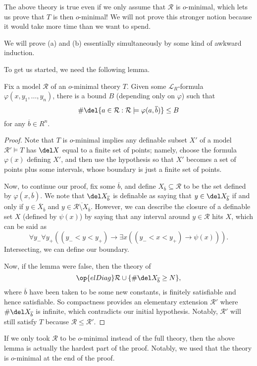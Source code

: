 \documentclass[../notes.tex]{subfiles}
\begin{document}
\begin{remark}
	The above theory is true even if we only assume that $\mathcal R$ is $o$-minimal, which lets us prove that $T$ is then $o$-minimal! We will not prove this stronger notion because it would take more time than we want to spend.
\end{remark}
We will prove (a) and (b) essentially simultaneously by some kind of awkward induction.

To get us started, we need the following lemma.
\begin{lemma}
	Fix a model $\mathcal R$ of an $o$-minimal theory $T$. Given some $\mathcal L_R$-formula $\varphi(x,y_1,\ldots,y_n)$, there is a bound $B$ (depending only on $\varphi$) such that
	\[\#\del\{a\in\mathcal R:\mathcal R\models\varphi(a,\overline b)\}\le B\]
	for any $\overline b\in R^n$.
\end{lemma}
\begin{proof}
	Note that $T$ is $o$-minimal implies any definable subset $X'$ of a model $\mathcal R'\models T$ has $\del X$ equal to a finite set of points; namely, choose the formula $\varphi(x)$ defining $X'$, and then use the hypothesis so that $X'$ becomes a set of points plus some intervals, whose boundary is just a finite set of points.

	Now, to continue our proof, fix some $\overline b$, and define $X_{\overline b}\subseteq\mathcal R$ to be the set defined by $\varphi(x,\overline b)$. We note that $\del X_{\overline b}$ is definable as saying that $y\in\del X_{\overline b}$ if and only if $y\in\overline X_{\overline b}$ and $y\in\overline{\mathcal R\setminus X_{\overline b}}$. However, we can describe the closure of a definable set $X$ (defined by $\psi(x)$) by saying that any interval around $y\in\mathcal R$ hits $X$, which can be said as
	\[\forall y_-\forall y_+((y_-<y<y_+)\to\exists x((y_-<x<y_+)\to\psi(x))).\]
	Intersecting, we can define our boundary.

	Now, if the lemma were false, then the theory of
	\[\op{elDiag}\mathcal R\cup\{\#\del X_{\overline b}\ge N\},\]
	where $\overline b$ have been taken to be some new constants, is finitely satisfiable and hence satisfiable. So compactness provides an elementary extension $\mathcal R'$ where $\#\del X_{\overline b}$ is infinite, which contradicts our initial hypothesis. Notably, $\mathcal R'$ will still satisfy $T$ because $\mathcal R\le\mathcal R'$.
\end{proof}
\begin{remark}
	If we only took $\mathcal R$ to be $o$-minimal instead of the full theory, then the above lemma is actually the hardest part of the proof. Notably, we used that the theory is $o$-minimal at the end of the proof.
\end{remark}
\end{document}
